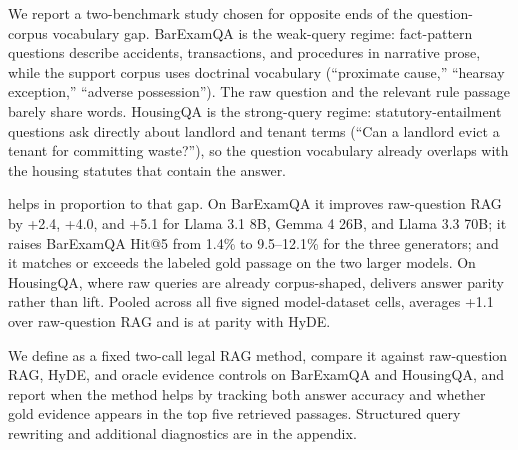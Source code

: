 We report a two-benchmark study chosen for opposite ends of the
question-corpus vocabulary gap. BarExamQA is the weak-query regime:
fact-pattern questions describe accidents, transactions, and procedures in
narrative prose, while the support corpus uses doctrinal vocabulary
(``proximate cause,'' ``hearsay exception,'' ``adverse possession''). The
raw question and the relevant rule passage barely share words. HousingQA is
the strong-query regime: statutory-entailment questions ask directly about
landlord and tenant terms (``Can a landlord evict a tenant for committing
waste?''), so the question vocabulary already overlaps with the housing
statutes that contain the answer.

\hyre{} helps in proportion to that gap. On BarExamQA it improves raw-question
RAG by +2.4\pp{}, +4.0\pp{}, and +5.1\pp{} for Llama 3.1 8B, Gemma 4 26B, and
Llama 3.3 70B; it raises BarExamQA Hit@5 from 1.4\% to 9.5--12.1\% for the
three generators; and it matches or exceeds the labeled gold passage on the
two larger models. On HousingQA, where raw queries are already corpus-shaped,
\hyre{} delivers answer parity rather than lift. Pooled across all five
signed model-dataset cells, \hyre{} averages +1.1\pp{} over raw-question RAG
and is at parity with HyDE.

We define \hyre{} as a fixed two-call legal RAG method, compare it against
raw-question RAG, HyDE, and oracle evidence controls on BarExamQA and
HousingQA, and report when the method helps by tracking both answer accuracy
and whether gold evidence appears in the top five retrieved passages.
Structured query rewriting and additional diagnostics are in the appendix.
